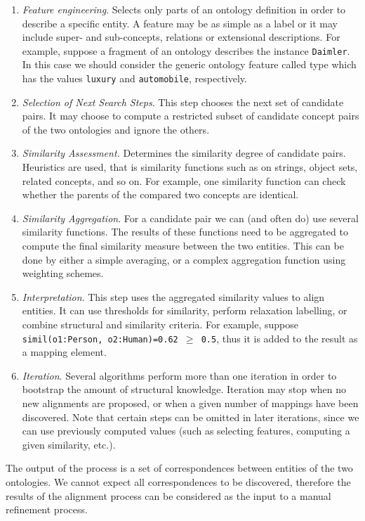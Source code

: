 \begin{enumerate}
\item \textit{Feature engineering}. Selects only parts of an ontology
definition in order to describe a specific entity. A feature may be as
simple as a label or it may include super- and sub-concepts, relations
or extensional descriptions.\newline
For example, suppose a fragment of an ontology describes the instance
\texttt{Daimler}. In this case we should consider the
generic ontology feature called type which has the values
\texttt{luxury} and \texttt{automobile},
respectively. 
\item \textit{Selection of Next Search Steps}. This step chooses the
next set of candidate pairs. It may choose to compute a restricted
subset of candidate concept pairs of the two ontologies and ignore the
others. 
\item \textit{Similarity Assessment.} Determines the similarity degree
of candidate pairs. Heuristics are used, that is similarity functions
such as on strings, object sets, related concepts, and so on.\newline
For example, one similarity function can check whether the parents of
the compared two concepts are identical. 
\item \textit{Similarity Aggregation}. For a candidate pair we can (and
often do) use several similarity functions. The results of these
functions need to be aggregated to compute the final similarity measure
between the two entities. This can be done by either a simple
averaging, or a complex aggregation function using weighting schemes. 
\item \textit{Interpretation}. This step uses the aggregated similarity
values to align entities. It can use thresholds for similarity, perform
relaxation labelling, or combine structural and similarity
criteria.\newline
For example, suppose \texttt{simil(o1:Person,
o2:Human)=0.62 ${\geq}$ 0.5}, thus it is added to the result as a
mapping element. 
\item \textit{Iteration}. Several algorithms perform more than one
iteration in order to bootstrap the amount of structural knowledge.
Iteration may stop when no new alignments are proposed, or when a given
number of mappings have been discovered. Note that certain steps can be
omitted in later iterations, since we can use previously computed
values (such as selecting features, computing a given similarity,
etc.). 
\end{enumerate}
The output of the process is a set of correspondences between entities
of the two ontologies. We cannot expect all correspondences to be
discovered, therefore the results of the alignment process can be
considered as the input to a manual refinement process. 

